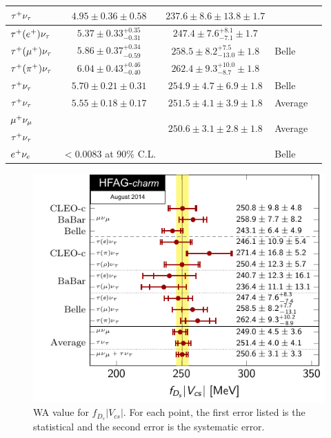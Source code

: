 \begin{table}[t!]
\begin{center}
\begin{tabular}{lccll}
\midrule
\rowcolor{LightGray}
$\tau^+\nu_{\tau}$			& $4.95\pm0.36\pm0.58$		& $237.6 \pm 8.6 \pm 13.8 \pm 1.7$   & \babar &\\
\midrule
$\tau^+(e^+)\nu_{\tau}$  			& $5.37\pm0.33^{+0.35}_{-0.31}$ & $247.4 \pm 7.6^{+8.1}_{-7.1} \pm 1.7$  & \multirow{3}{*}{Belle} & \multirow{3}{*}{\cite{Zupanc:2013byn}} \\
$\tau^+(\mu^+)\nu_{\tau}$ 		 	& $5.86\pm0.37^{+0.34}_{-0.59}$ & $258.5 \pm 8.2^{+7.5}_{-13.0} \pm 1.8$  & &\\ 
$\tau^+(\pi^+)\nu_{\tau}$  			& $6.04\pm0.43^{+0.46}_{-0.40}$ & $262.4 \pm 9.3^{+10.0}_{-8.7} \pm 1.8$  & &\\
\midrule
\rowcolor{LightGray}
$\tau^+\nu_{\tau}$			& $5.70\pm0.21\pm0.31$		& $254.9 \pm 4.7 \pm 6.9 \pm 1.8$   & Belle & \\
\midrule
\rowcolor{Gray}
$\tau^+\nu_{\tau}$ 			& $5.55\pm0.18\pm0.17$ 		& $251.5 \pm 4.1 \pm 3.9 \pm 1.8$	& Average & \\
\midrule
\rowcolor{Gray}
$\mu^+\nu_{\mu}$  			&		 		& \multirow{2}{*}{$250.6\pm 3.1\pm 2.8\pm1.8$}	& \multirow{2}{*}{Average} & \\
\rowcolor{Gray}
$\tau^+\nu_{\tau}$ 			&		 		& \multirow{-2}{*}{$250.6\pm 3.1\pm 2.8\pm1.8$}	& \multirow{-2}{*}{Average} & \\
\midrule
$e^+\nu_{e}$				& $<0.0083$ at 90\% C.L.	& 					& Belle & \cite{Zupanc:2013byn} \\
\bottomrule
\end{tabular}
\end{center}
\end{table}
\begin{figure}[hbt!]
\centering
\includegraphics[width=1\textwidth]{figures/charm/fDsVcs.pdf}
\caption{
WA value for $f_{D_s}|V_{cs}|$. For each point, the first error listed is the statistical and the second error is the systematic error.
\label{fig:ExpDsLeptonic}
}
\end{figure}


